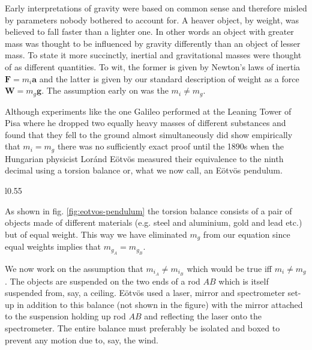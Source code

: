 \documentclass[english,seminar]{lecture}
\begin{document}
Early interpretations of gravity were based on common sense and therefore misled by parameters nobody bothered to account for. A heaver object, by weight, was believed to fall faster than a lighter one. In other words an object with greater mass was thought to be influenced by gravity differently than an object of lesser mass. To state it more succinctly, inertial and gravitational masses were thought of as different quantities. To wit, the former is given by Newton's laws of inertia $\mathbf{F} = m_i \mathbf{a}$ and the latter is given by our standard description of weight as a force $\mathbf{W} = m_g \mathbf{g}$. The assumption early on was the $m_i \neq m_g$.

Although experiments like the one Galileo performed at the Leaning Tower of Pisa where he dropped two equally heavy masses of different substances and found that they fell to the ground almost simultaneously did show empirically that $m_i = m_g$ there was no sufficiently exact proof until the 1890s when the Hungarian physicist Lor\'{a}nd E\"{o}tv\"{o}s measured their equivalence to the ninth decimal using a torsion balance or, what we now call, an E\"{o}tv\"{o}s pendulum.

\begin{wrapfigure}{l}{0.55\textwidth}
\vspace*{0.15cm}
\caption{Schematic of E\"{o}tv\"{o}s's pendulum.}\label{fig:eotvos-pendulum}
\end{wrapfigure}

As shown in fig. \ref{fig:eotvos-pendulum} the torsion balance consists of a pair of objects made of different materials (e.g. steel and aluminium, gold and lead etc.) but of equal weight. This way we have eliminated $m_g$ from our equation since equal weights implies that $m_{g_A} = m_{g_B}$.

We now work on the assumption that $m_{i_A} \neq m_{i_B}$ which would be true iff $m_i \neq m_g$. The objects are suspended on the two ends of a rod $AB$ which is itself suspended from, say, a ceiling. E\"{o}tv\"{o}s used a laser, mirror and spectrometer set-up in addition to this balance (not shown in the figure) with the mirror attached to the suspension holding up rod $AB$ and reflecting the laser onto the spectrometer. The entire balance must preferably be isolated and boxed to prevent any motion due to, say, the wind.
\end{document}
